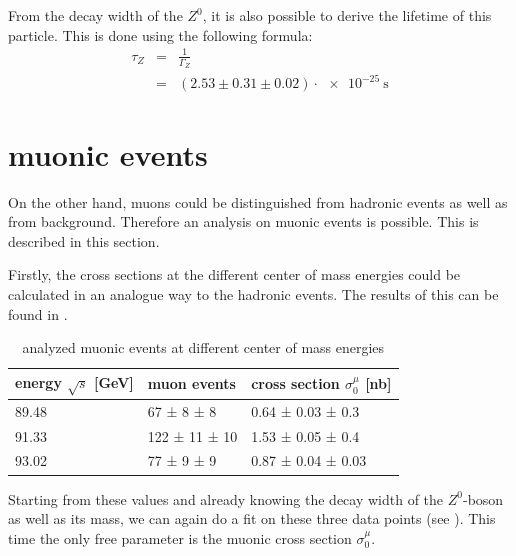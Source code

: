 \documentclass[epj,nopacs]{svjour}
\begin{document}
From the decay width of the $Z^0$, it is also possible to derive the lifetime of this particle. This is done using the following formula:
\begin{eqnarray}
τ_Z &=& \frac{1}{Γ_Z}\\
&=& (2.53 \pm 0.31 \pm 0.02) \cdot \SI{e-25}{\second}
\end{eqnarray}

\section{muonic events}

On the other hand, muons could be distinguished from hadronic events as well as from background. Therefore an analysis on muonic events is possible. This is described in this section.

Firstly, the cross sections at the different center of mass energies could be calculated in an analogue way to the hadronic events. The results of this can be found in .

\begin{table}[h]
\begin{center}
\begin{tabular}{|l|l|l|}
\hline
energy $\sqrt{s}$ [\si{\GeV}] & muon events & cross section $σ_0^μ$ [\si{\nano\barn}]\\
\hline
89.48 & \phantom{0}67 ± \phantom{0}8 ± \phantom{0}8  & 0.64 ± 0.03 ± 0.3 \\
91.33 & 122 ± 11 ± 10 & 1.53 ± 0.05 ± 0.4 \\
93.02 & \phantom{0}77 ± \phantom{0}9 ± \phantom{0}9 & 0.87 ± 0.04 ± 0.03 \\
\hline
\end{tabular}
\vspace*{0.3cm}
\caption{\baselineskip=0.38cm analyzed muonic events at different center of mass
energies}
\label{tab:muon_events}
\end{center}
\vspace*{-0.5cm}
\end{table}

Starting from these values and already knowing the decay width of the
$Z^0$-boson as well as its mass, we can again do a fit on these three data
points (see ). This time the only free parameter is the muonic
cross section $σ_0^μ$.
\end{document}
